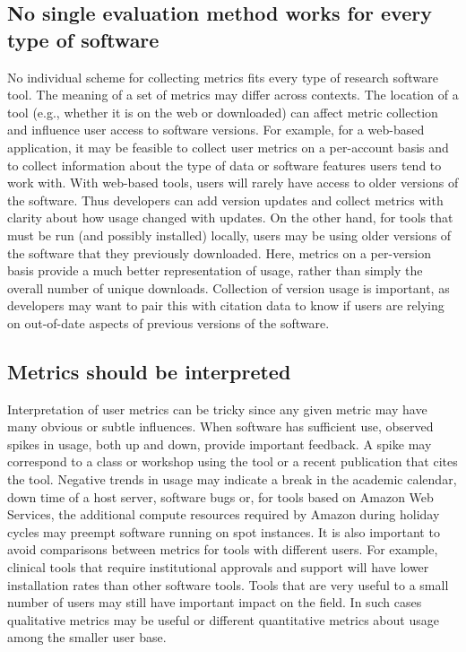 \documentclass{article}
\begin{document}
\subsection{No single evaluation method works for every type of software}
\label{sec:no_one_way}
No individual scheme for collecting metrics fits every type of research software tool.  The meaning of a set of metrics may differ across contexts. The location of a tool (e.g., whether it is on the web or downloaded) can affect metric collection and influence user access to software versions. For example, for a web-based application, it may be feasible to collect user metrics on a per-account basis and to collect information about the type of data or software features users tend to work with. With web-based tools, users will rarely have access to older versions of the software. Thus developers can add version updates and collect metrics with clarity about how usage changed with updates. On the other hand, for tools that must be run (and possibly installed) locally, users may be using older versions of the software that they previously downloaded. Here, metrics on a per-version basis provide a much better representation of usage, rather than simply the overall number of unique downloads. Collection of version usage is important, as developers may want to pair this with citation data to know if users are relying on out-of-date aspects of previous versions of the software.



 \subsection{Metrics should be interpreted}
 
 Interpretation of user metrics can be tricky since any given metric may have many obvious or subtle influences. When software has sufficient use, observed spikes in usage, both up and down, provide important feedback. A spike may correspond to a class or workshop using the tool or a recent publication that cites the tool. Negative trends in usage may indicate a break in the academic calendar, down time of a host server, software bugs or, for tools based on Amazon Web Services, the additional compute resources required by Amazon during holiday cycles may preempt software running on spot instances. It is also important to avoid comparisons between metrics for tools with different users. For example, clinical tools that require institutional approvals and support will have lower installation rates than other software tools. Tools that are very useful to a small number of users may still have important impact on the field. In such cases qualitative metrics may be useful or different quantitative metrics about usage among the smaller user base.  
 
\end{document}
